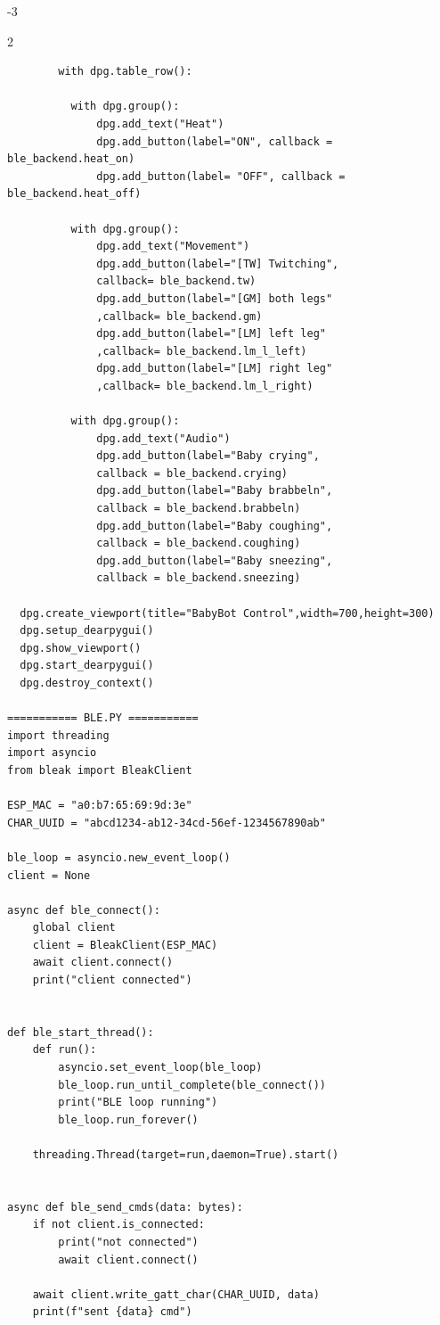 \begin{relsize}{-3}
\begin{multicols}{2}
\begin{verbatim}
        with dpg.table_row(): 

          with dpg.group():
              dpg.add_text("Heat")
              dpg.add_button(label="ON", callback = ble_backend.heat_on)
              dpg.add_button(label= "OFF", callback = ble_backend.heat_off)

          with dpg.group():
              dpg.add_text("Movement")
              dpg.add_button(label="[TW] Twitching",
              callback= ble_backend.tw)
              dpg.add_button(label="[GM] both legs"
              ,callback= ble_backend.gm)
              dpg.add_button(label="[LM] left leg"
              ,callback= ble_backend.lm_l_left)
              dpg.add_button(label="[LM] right leg"
              ,callback= ble_backend.lm_l_right)

          with dpg.group():
              dpg.add_text("Audio")
              dpg.add_button(label="Baby crying", 
              callback = ble_backend.crying)
              dpg.add_button(label="Baby brabbeln",
              callback = ble_backend.brabbeln)
              dpg.add_button(label="Baby coughing",
              callback = ble_backend.coughing)
              dpg.add_button(label="Baby sneezing",
              callback = ble_backend.sneezing)

  dpg.create_viewport(title="BabyBot Control",width=700,height=300)
  dpg.setup_dearpygui()
  dpg.show_viewport()
  dpg.start_dearpygui()
  dpg.destroy_context()

=========== BLE.PY ===========
import threading
import asyncio
from bleak import BleakClient

ESP_MAC = "a0:b7:65:69:9d:3e" 
CHAR_UUID = "abcd1234-ab12-34cd-56ef-1234567890ab" 

ble_loop = asyncio.new_event_loop() 
client = None

async def ble_connect():
    global client 
    client = BleakClient(ESP_MAC)
    await client.connect()
    print("client connected") 


def ble_start_thread():
    def run():
        asyncio.set_event_loop(ble_loop)
        ble_loop.run_until_complete(ble_connect())
        print("BLE loop running")
        ble_loop.run_forever()
    
    threading.Thread(target=run,daemon=True).start()


async def ble_send_cmds(data: bytes):   
    if not client.is_connected:
        print("not connected")
        await client.connect()
    
    await client.write_gatt_char(CHAR_UUID, data) 
    print(f"sent {data} cmd") 


\end{verbatim}
\end{multicols}
\end{relsize}

